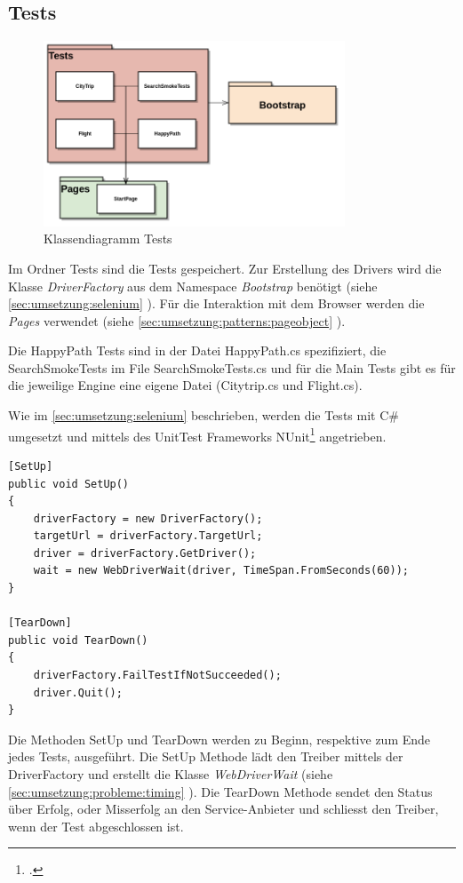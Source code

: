 \subsection{Tests}
\begin{figure}[H]
	\centering
	\includegraphics[width=0.8\textwidth]{images/semesterarbeit class diagram - tests.png}
	\caption{Klassendiagramm Tests}
	\label{fig:umsetzung:architektur:tests}
\end{figure}
Im Ordner Tests sind die Tests gespeichert. Zur Erstellung des Drivers wird die Klasse \textit{DriverFactory} aus dem Namespace \textit{Bootstrap} benötigt (siehe \cref{sec:umsetzung:selenium} ). Für die Interaktion mit dem Browser werden die \textit{Pages} verwendet (siehe \cref{sec:umsetzung:patterns:pageobject} ).

Die HappyPath Tests sind in der Datei HappyPath.cs spezifiziert, die SearchSmokeTests im File SearchSmokeTests.cs und für die Main Tests gibt es für die jeweilige Engine eine eigene Datei (Citytrip.cs und Flight.cs).

Wie im \cref{sec:umsetzung:selenium}  beschrieben, werden die Tests mit C\# umgesetzt und mittels des UnitTest Frameworks NUnit\footcite{NUnit_-_Home_2015-09-26} angetrieben.

\begin{lstlisting}
[SetUp]
public void SetUp()
{
    driverFactory = new DriverFactory();
    targetUrl = driverFactory.TargetUrl;
    driver = driverFactory.GetDriver();
    wait = new WebDriverWait(driver, TimeSpan.FromSeconds(60));
}

[TearDown]
public void TearDown()
{
    driverFactory.FailTestIfNotSucceeded();
    driver.Quit();
}
\end{lstlisting}

Die Methoden SetUp und TearDown werden zu Beginn, respektive zum Ende jedes Tests, ausgeführt. Die SetUp Methode lädt den Treiber mittels der DriverFactory und erstellt die Klasse \textit{WebDriverWait} (siehe \cref{sec:umsetzung:probleme:timing} ). Die TearDown Methode sendet den Status über Erfolg, oder Misserfolg an den Service-Anbieter und schliesst den Treiber, wenn der Test abgeschlossen ist.

